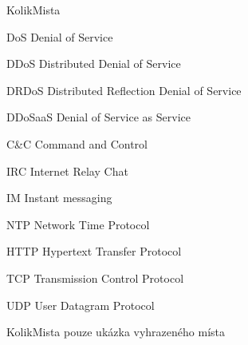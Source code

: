 \begin{seznamzkratek}{KolikMista}

		{DoS}
		{Denial of Service}
		
		{DDoS}
		{Distributed Denial of Service}
	
		{DRDoS}
		{Distributed Reflection Denial of Service}
		
		{DDoSaaS}
		{Denial of Service as Service}
	
		{C\&C} %
		{Command and Control}
		
		{IRC}
		{Internet Relay Chat}
		
		{IM}
		{Instant messaging}
		
		{NTP}
		{Network Time Protocol}
	
		{HTTP}
		{Hypertext Transfer Protocol}
	
		{TCP}
		{Transmission Control Protocol}
	
		{UDP}
		{User Datagram Protocol}
	


		{KolikMista}
		{pouze ukázka vyhrazeného místa}

\end{seznamzkratek}
